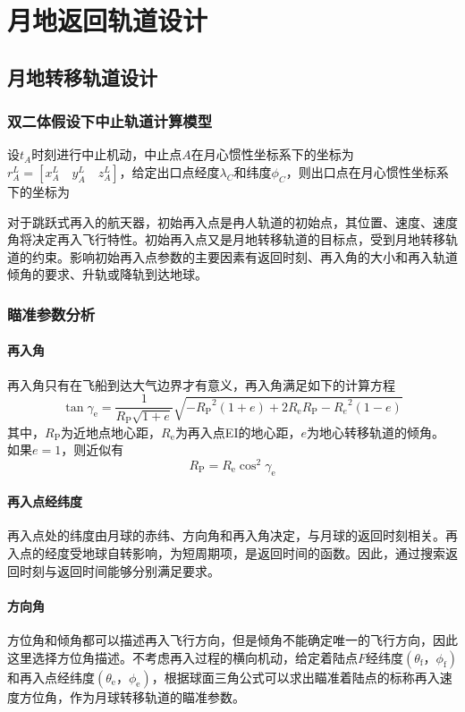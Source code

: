 \chapter{月地返回轨道设计}
\section{月地转移轨道设计}
\subsection{双二体假设下中止轨道计算模型}
设$t_A$时刻进行中止机动，中止点$A$在月心惯性坐标系下的坐标为$r_A^L=[x_A^L\quad y_A^L\quad z_A^L]$，给定出口点经度$\lambda_C$和纬度$\phi_C$，则出口点在月心惯性坐标系下的坐标为

对于跳跃式再入的航天器，初始再入点是冉人轨道的初始点，其位置、速度、速度角将决定再入飞行特性。初始再入点又是月地转移轨道的目标点，受到月地转移轨道的约束。影响初始再入点参数的主要因素有返回时刻、再入角的大小和再入轨道倾角的要求、升轨或降轨到达地球。


\subsection{瞄准参数分析}
\subsubsection{再入角}
再入角只有在飞船到达大气边界才有意义，再入角满足如下的计算方程
\begin{equation}
	\tan \gamma_\mathrm{e}=\frac{1}{R_\mathrm{P}\sqrt{1+e}}\sqrt{-{R_\mathrm{P}}^2(1+e)+2R_\mathrm{e}R_\mathrm{P}-{R_e}^2(1-e)}
\end{equation}
其中，$R_\mathrm{P}$为近地点地心距，$R_\mathrm{e}$为再入点EI的地心距，$e$为地心转移轨道的倾角。
如果$e=1$，则近似有
\begin{equation}
	R_{\mathrm P}=R_{\mathrm{e}}\cos^2\gamma_{\mathrm{e}}
\end{equation}
\subsubsection{再入点经纬度}
再入点处的纬度由月球的赤纬、方向角和再入角决定，与月球的返回时刻相关。再入点的经度受地球自转影响，为短周期项，是返回时间的函数。因此，通过搜索返回时刻与返回时间能够分别满足要求。
\subsubsection{方向角}
方位角和倾角都可以描述再入飞行方向，但是倾角不能确定唯一的飞行方向，因此这里选择方位角描述。不考虑再入过程的横向机动，给定着陆点$F$经纬度$(\theta_{\mathrm f}，\phi_{\mathrm f})$和再入点经纬度$(\theta_{\mathrm e}，\phi_{\mathrm e})$，根据球面三角公式可以求出瞄准着陆点的标称再入速度方位角，作为月球转移轨道的瞄准参数。

